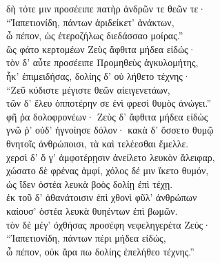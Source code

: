 \begin{pages}
\begin{Leftside}
\quad{}δὴ τότε μιν προσέειπε πατὴρ ἀνδρῶν τε θεῶν τε· \\
``Ἰαπετιονίδη, πάντων ἀριδείκετ' ἀνάκτων, \\
ὦ πέπον, ὡς ἑτεροζήλως διεδάσσαο μοίρας.'' \\

\quad{}ὣς φάτο κερτομέων Ζεὺς ἄφθιτα μήδεα εἰδώς·  \\
τὸν δ' αὖτε προσέειπε Προμηθεὺς ἀγκυλομήτης,\\
ἦκ' ἐπιμειδήσας, δολίης δ' οὐ λήθετο τέχνης· \\
``Ζεῦ κύδιστε μέγιστε θεῶν αἰειγενετάων, \\
τῶν δ' ἕλευ ὁπποτέρην σε ἐνὶ φρεσὶ θυμὸς ἀνώγει.'' \\

\quad{}φῆ ῥα δολοφρονέων· Ζεὺς δ' ἄφθιτα μήδεα εἰδὼς  \\
γνῶ ῥ' οὐδ' ἠγνοίησε δόλον· κακὰ δ' ὄσσετο θυμῷ \\
θνητοῖς ἀνθρώποισι, τὰ καὶ τελέεσθαι ἔμελλε.\\
χερσὶ δ' ὅ γ' ἀμφοτέρῃσιν ἀνείλετο λευκὸν ἄλειφαρ, \\
χώσατο δὲ φρένας ἀμφί, χόλος δέ μιν ἵκετο θυμόν,\\
ὡς ἴδεν ὀστέα λευκὰ βοὸς δολίῃ ἐπὶ τέχῃ. \\
ἐκ τοῦ δ' ἀθανάτοισιν ἐπὶ χθονὶ φῦλ' ἀνθρώπων\\
καίουσ' ὀστέα λευκὰ θυηέντων ἐπὶ βωμῶν. \\

\quad{}τὸν δὲ μέγ' ὀχθήσας προσέφη νεφεληγερέτα Ζεύς· \\
``Ἰαπετιονίδη, πάντων πέρι μήδεα εἰδώς, \\
ὦ πέπον, οὐκ ἄρα πω δολίης ἐπελήθεο τέχνης.''  \\


\end{Leftside}
\end{pages}
